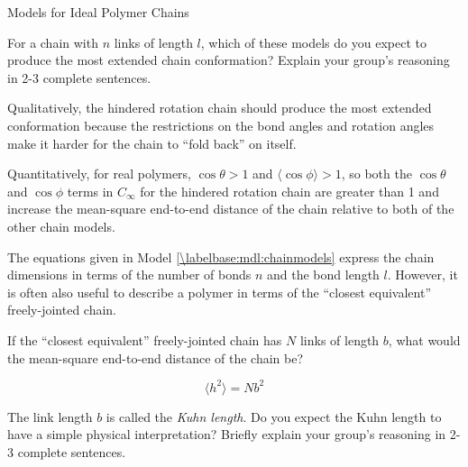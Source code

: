\begin{activity}{Models for Ideal Polymer Chains}
\begin{ctqs}
	\question For a chain with $n$ links of length $l$, which of these models do you expect to produce the most extended chain conformation?  Explain your group's reasoning in 2-3 complete sentences. \label{\labelbase:ctq:stiffness}
	
		\begin{solution}[1.5in]{}
			Qualitatively, the hindered rotation chain should produce the most extended conformation because the restrictions on the bond angles and rotation angles make it harder for the chain to ``fold back'' on itself.
			
			Quantitatively, for real polymers, $\cos\theta > 1$ and $\langle \cos\phi \rangle > 1$, so both the $\cos \theta$ and $\cos \phi$ terms in $C_\infty$ for the hindered rotation chain are greater than 1 and increase the mean-square end-to-end distance of the chain relative to both of the other chain models.
		\end{solution}

	
	\question The equations given in Model \ref{\labelbase:mdl:chainmodels} express the chain dimensions in terms of the number of bonds $n$ and the bond length $l$.  However, it is often also useful to describe a polymer in terms of the ``closest equivalent'' freely-jointed chain. \label{\labelbase:ctq:statseg}
	
			If the ``closest equivalent'' freely-jointed chain has $N$ links of length $b$, what would the mean-square end-to-end distance of the chain be? \label{\labelbase:ctq:Nb2}
	
		\begin{solution}[0.75in]{}
			\begin{equation*}
				\langle h^2 \rangle = Nb^2
			\end{equation*}
		\end{solution}
			
%	
%		
		
	\question The link length $b$ is called the \emph{Kuhn length}.  Do you expect the Kuhn length to have a simple physical interpretation?  Briefly explain your group's reasoning in 2-3 complete sentences.\label{\labelbase:exc:statseginterp}
	

\end{ctqs}
\end{activity}
